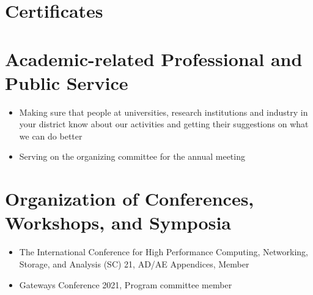 \documentclass[11pt,a4paper,sans]{moderncv}
\begin{document}
\section{Certificates}
\section{Academic-related Professional and Public Service}

\begin{itemize}[leftmargin=4cm]
\item Making sure that people at universities, research institutions and industry in your district know
  about our activities and getting their suggestions on what we can do better
\item Serving on the organizing committee for the annual meeting
\end{itemize}

\section{Organization of Conferences, Workshops, and Symposia}
\begin{itemize}[leftmargin=4cm]
\item The International Conference for High Performance Computing, Networking, Storage, and Analysis (SC) 21, AD/AE Appendices, Member
\item Gateways Conference 2021, Program committee member
\end{itemize}
\end{document}
